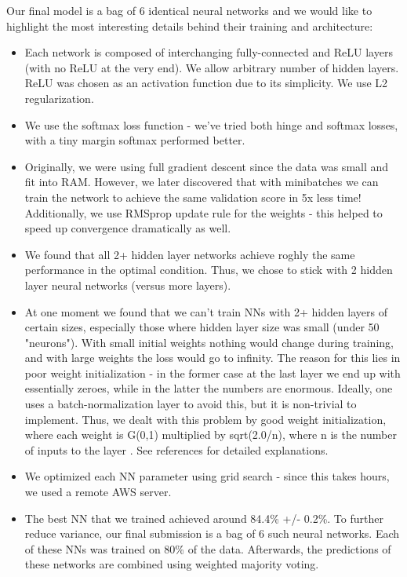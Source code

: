 \documentclass[10pt,conference,compsocconf]{IEEEtran}
\begin{document}
Our final model is a bag of 6 identical neural networks and we would like to highlight the most interesting details behind their training and architecture:
\begin{itemize}
\item Each network is composed of interchanging fully-connected and ReLU \cite{relu} layers (with no ReLU at the very end). We allow arbitrary number of hidden layers. ReLU was chosen as an activation function due to its simplicity. We use L2 regularization.
\item We use the softmax \cite{softmax} loss function - we've tried both hinge and softmax losses, with a tiny margin softmax performed better.
\item Originally, we were using full gradient descent since the data was small and fit into RAM. However, we later discovered that with minibatches we can train the network to achieve the same validation score in 5x less time! Additionally, we use RMSprop \cite{rmsprop} update rule for the weights - this helped to speed up convergence dramatically as well.
\item We found that all 2+ hidden layer networks achieve roghly the same performance in the optimal condition. Thus, we chose to stick with 2 hidden layer neural networks (versus more layers).
\item At one moment we found that we can't train NNs with 2+ hidden layers of certain sizes, especially those where hidden layer size was small (under 50 "neurons"). With small initial weights nothing would change during training, and with large weights the loss would go to infinity. The reason for this lies in poor weight initialization - in the former case at the last layer we end up with essentially zeroes, while in the latter the numbers are enormous. Ideally, one uses a batch-normalization layer to avoid this, but it is non-trivial to implement. Thus, we dealt with this problem by good weight initialization, where each weight is G(0,1) multiplied by sqrt(2.0/n), where n is the number of inputs to the layer \cite{calibratin_variance_blog} \cite{calibrating_variance_paper}. See references for detailed explanations.
\item We optimized each NN parameter using grid search - since this takes hours, we used a remote AWS server.
\item The best NN that we trained achieved around 84.4\% +/- 0.2\%. To further reduce variance, our final submission is a bag of 6 such neural networks. Each of these NNs was trained on 80\% of the data. Afterwards, the predictions of these networks are combined using weighted majority voting.
\end{itemize}
\end{document}
